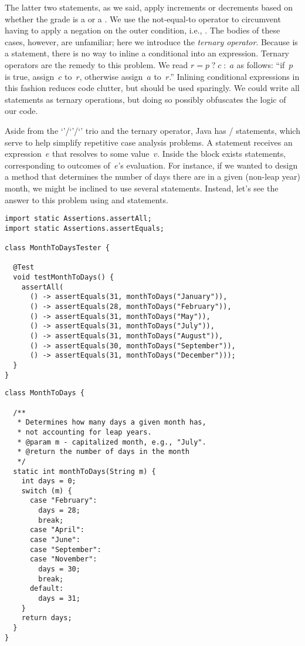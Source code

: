 The latter two  statements, as we said, apply increments or decrements based on whether the grade is a \ttt{+} or a \ttt{-}.
We use the not-equal-to operator \ttt{!=} to circumvent having to apply a negation on the outer condition, i.e., . 
The bodies of these cases, however, are unfamiliar; here we introduce the \emph{ternary operator}. 
Because  is a statement, there is no way to inline a conditional into an expression. 
Ternary operators are the remedy to this problem. 
We read ${r = p\;?\;c\;:\;a}$ as follows: ``if~$p$ is true, assign~$c$ to~$r$, otherwise assign~$a$ to~$r$.'' 
Inlining conditional expressions in this fashion reduces code clutter, but should be used sparingly. We could write all  statements as ternary operations, but doing so possibly obfuscates the logic of our code.

Aside from the `'/`'/`' trio and the ternary operator, Java has / statements, which serve to help simplify repetitive case analysis problems. 
A  statement receives an expression~$e$ that resolves to some value~$v$. 
Inside the  block exists  statements, corresponding to outcomes of~$e$'s evaluation. 
For instance, if we wanted to design a method that determines the number of days there are in a given (non-leap year) month, we might be inclined to use several  statements. Instead, let's see the answer to this problem using  and  statements.

\begin{lstlisting}[language=MyJava]
import static Assertions.assertAll;
import static Assertions.assertEquals;

class MonthToDaysTester {

  @Test
  void testMonthToDays() {
    assertAll(
      () -> assertEquals(31, monthToDays("January")),
      () -> assertEquals(28, monthToDays("February")),
      () -> assertEquals(31, monthToDays("May")),
      () -> assertEquals(31, monthToDays("July")),
      () -> assertEquals(31, monthToDays("August")),
      () -> assertEquals(30, monthToDays("September")),
      () -> assertEquals(31, monthToDays("December")));
  }
}
\end{lstlisting}

\begin{lstlisting}[language=MyJava]
class MonthToDays {

  /**
   * Determines how many days a given month has, 
   * not accounting for leap years.
   * @param m - capitalized month, e.g., "July".
   * @return the number of days in the month
   */
  static int monthToDays(String m) {
    int days = 0;
    switch (m) {
      case "February":
        days = 28;
        break;
      case "April":
      case "June":
      case "September":
      case "November":
        days = 30;
        break;
      default:
        days = 31;
    }
    return days;
  }
}
\end{lstlisting}


